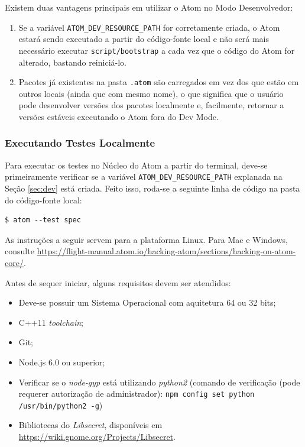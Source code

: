 	Existem duas vantagens principais em utilizar o Atom no Modo Desenvolvedor:
	\begin{enumerate}
		\item Se a variável \verb|ATOM_DEV_RESOURCE_PATH| for corretamente criada, o Atom estará sendo executado a partir do código-fonte local e não será mais necessário executar \verb|script/bootstrap| a cada vez que o código do Atom for alterado, bastando reiniciá-lo.
		\item Pacotes já existentes na pasta \verb|.atom| são carregados em vez dos que estão em outros locais (ainda que com mesmo nome), o que significa que o usuário pode desenvolver versões dos pacotes localmente e, facilmente, retornar a versões estáveis executando o Atom fora do Dev Mode.
	\end{enumerate}

	\subsubsection{Executando Testes Localmente}
	Para executar os testes no Núcleo do Atom a partir do terminal, deve-se primeiramente verificar se a variável \verb|ATOM_DEV_RESOURCE_PATH| explanada na Seção \ref{sec:dev} está criada. Feito isso, roda-se a seguinte linha de código na pasta do código-fonte local:
\begin{Verbatim}[fontsize=\footnotesize]
$ atom --test spec
\end{Verbatim}

	As instruções a seguir servem para a plataforma Linux. Para Mac e Windows, consulte \href{https://flight-manual.atom.io/hacking-atom/sections/hacking-on-atom-core/}{https://flight-manual.atom.io/hacking-atom/sections/hacking-on-atom-core/}.

	Antes de sequer iniciar, alguns requisitos devem ser atendidos:
	\begin{itemize}
		\item Deve-se possuir um Sistema Operacional com aquitetura 64 ou 32 bits;
		\item C++11 \textit{toolchain};
		\item Git;
		\item Node.js 6.0 ou superior;
		\item Verificar se o \textit{node-gyp} está utilizando \textit{python2} (comando de verificação (pode requerer autorização de administrador): \verb|npm config set python /usr/bin/python2 -g|)
		\item Bibliotecas do \textit{Libsecret}, disponíveis em \href{https://wiki.gnome.org/Projects/Libsecret}{https://wiki.gnome.org/Projects/Libsecret}.
	\end{itemize}

